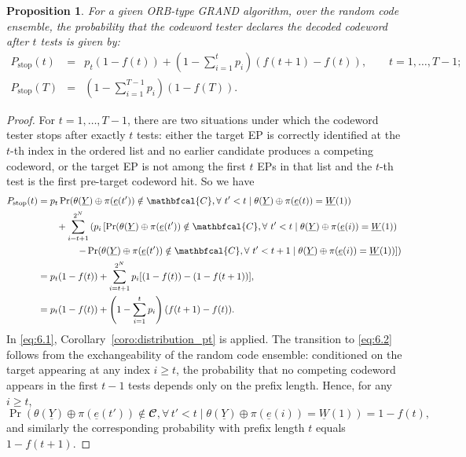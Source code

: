 \documentclass[letterpaper,draftclsnofoot,onecolumn]{IEEEtran}
\newtheorem{proposition}{Proposition}
\begin{document}
\begin{proposition}\label{prop:stop_at_t}
     For a given ORB-type GRAND algorithm, over the random code ensemble, the probability that the codeword tester declares the decoded codeword after $t$ tests is given by:
     \begin{eqnarray}
         P_{\text{stop}}(t) &=& p_t (1 - f(t)) + \left(1-\sum_{i=1}^{t}p_i\right)(f(t+1)-f(t)), \quad\quad t = 1, \ldots, T - 1;\label{eq:end_time}\\
         P_{\text{stop}}(T) &=& \left(1-\sum_{i=1}^{T-1}p_i\right)(1-f(T)).\label{eq:end_time_T}
     \end{eqnarray}
\end{proposition}
\begin{proof}
     For $t = 1, \ldots, T-1$, there are two situations under which the codeword tester stops after exactly $t$ tests: either the target EP is correctly identified at the $t$-th index in the ordered list and no earlier candidate produces a competing codeword, or the target EP is not among the first $t$ EPs in that list and the $t$-th test is the first pre-target codeword hit. So we have
     \begin{align}
        P_{\text{stop}}(t)& = p_t\Pr(\theta(\underline{Y})\oplus \pi(\underline{e}(t'))\notin \mathbfcal{C},\forall\ t'< t \mid \theta(\underline{Y})\oplus \pi(\underline{e}(t))=\underline{W}(1)) \notag \\
        &\quad\quad   +\sum_{i=t+1}^{2^N}\left( p_i  \left[\Pr(\theta(\underline{Y})\oplus \pi(\underline{e}(t'))\notin \mathbfcal{C},\forall\ t'< t \mid \theta(\underline{Y})\oplus \pi(\underline{e}(i)) =\underline{W}(1))\right.\right. \notag \\
        & \quad \quad \quad\quad \left.\left.- \Pr(\theta(\underline{Y})\oplus \pi(\underline{e}(t'))\notin \mathbfcal{C},\forall\ t'< t+1 \mid \theta(\underline{Y})\oplus \pi(\underline{e}(i))=\underline{W}(1))\right]\right) \label{eq:6.1}\\ 
        & = p_t(1 - f(t)) + \sum_{i=t+1}^{2^N}p_i[(1 - f(t)) - (1- f(t+1))], \label{eq:6.2}\\
        & = p_t(1 - f(t)) + \left(1 - \sum_{i=1}^{t}p_i\right)(f(t+1)-f(t)).\label{eq:6.3}
     \end{align}
    In \eqref{eq:6.1}, Corollary~\ref{coro:distribution_pt} is applied. The transition to \eqref{eq:6.2} follows from the exchangeability of the random code ensemble: conditioned on the target appearing at any index $i\ge t$, the probability that no competing codeword appears in the first $t-1$ tests depends only on the prefix length. Hence, for any $i\ge t$,
    \begin{equation}
    \Pr(\theta(\underline{Y})\oplus \pi(\underline{e}(t'))\notin \mathbfcal{C},\forall\, t'< t \mid \theta(\underline{Y})\oplus \pi(\underline{e}(i))=\underline{W}(1)) = 1-f(t),
    \end{equation}
    and similarly the corresponding probability with prefix length $t$ equals $1-f(t+1)$.


\end{proof}
\end{document}
